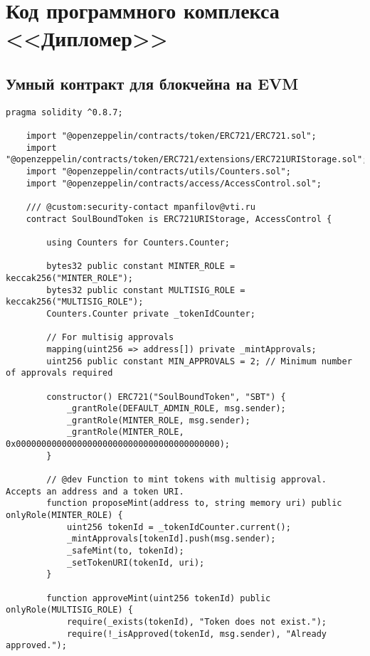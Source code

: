 \section{Код программного комплекса <<Дипломер>>}
\label{appendix:software_code}

\subsection{Умный контракт для блокчейна на EVM}
\label{appendix:sd_smartcon}

\begin{lstlisting}[label=lst:smartcon, language=Solidity, caption=Смарт-контракт]
    pragma solidity ^0.8.7;
    
    import "@openzeppelin/contracts/token/ERC721/ERC721.sol";
    import "@openzeppelin/contracts/token/ERC721/extensions/ERC721URIStorage.sol";
    import "@openzeppelin/contracts/utils/Counters.sol";
    import "@openzeppelin/contracts/access/AccessControl.sol";
    
    /// @custom:security-contact mpanfilov@vti.ru
    contract SoulBoundToken is ERC721URIStorage, AccessControl {
        
        using Counters for Counters.Counter;
    
        bytes32 public constant MINTER_ROLE = keccak256("MINTER_ROLE");
        bytes32 public constant MULTISIG_ROLE = keccak256("MULTISIG_ROLE");
        Counters.Counter private _tokenIdCounter;
        
        // For multisig approvals
        mapping(uint256 => address[]) private _mintApprovals;
        uint256 public constant MIN_APPROVALS = 2; // Minimum number of approvals required
    
        constructor() ERC721("SoulBoundToken", "SBT") {
            _grantRole(DEFAULT_ADMIN_ROLE, msg.sender);
            _grantRole(MINTER_ROLE, msg.sender);
            _grantRole(MINTER_ROLE, 0x0000000000000000000000000000000000000000);
        }
    
        // @dev Function to mint tokens with multisig approval. Accepts an address and a token URI.
        function proposeMint(address to, string memory uri) public onlyRole(MINTER_ROLE) {
            uint256 tokenId = _tokenIdCounter.current();
            _mintApprovals[tokenId].push(msg.sender);
            _safeMint(to, tokenId);
            _setTokenURI(tokenId, uri);
        }
    
        function approveMint(uint256 tokenId) public onlyRole(MULTISIG_ROLE) {
            require(_exists(tokenId), "Token does not exist.");
            require(!_isApproved(tokenId, msg.sender), "Already approved.");
            

\end{lstlisting}

